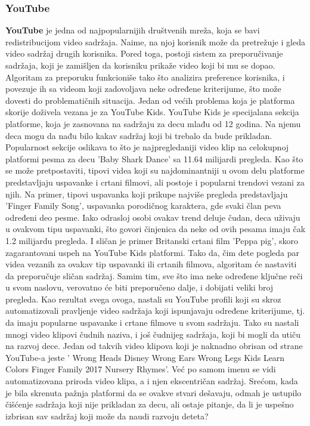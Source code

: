 \documentclass[a4paper]{article}
\begin{document}
\subsubsection{YouTube}
\textbf{YouTube} je jedna od najpopularnijih društvenih mreža, koja se bavi redistribucijom video sadržaja. Naime, na njoj korisnik može da pretrežuje i gleda video sadržaj drugih korisnika. Pored toga, postoji sistem za preporučivanje sadržaja, koji je zamišljen da korisniku prikaže video koji bi mu se dopao. Algoritam za preporuku funkcioniše tako što analizira preference korisnika, i povezuje ih sa videom koji zadovoljava neke određene kriterijume, što može dovesti do problematičnih situacija.
\newline
\newline
Jedan od većih problema koja je platforma skorije doživela vezana je za YouTube Kids. \cite{youtube} YouTube Kids je specijalana sekcija platforme, koja je zasnovana na sadržaju za decu mlađu od 12 godina. Na njemu deca mogu da nađu bilo kakav sadržaj koji bi trebalo da bude prikladan. Popularnost sekcije oslikava to što je najpregledaniji video klip na celokupnoj platformi pesma za decu 'Baby Shark Dance' sa 11.64 milijardi pregleda. Kao što se može pretpostaviti, tipovi videa koji su najdominantniji u ovom delu platforme predstavljaju uspavanke i crtani filmovi, ali postoje i popularni trendovi vezani za njih. 
\newline
Na primer, tipovi uspavanka koji prikupe najviše pregleda predstavljaju 'Finger Family Song', uspavanka porodičnog karaktera, gde svaki član peva određeni deo pesme. Iako odrasloj osobi ovakav trend deluje čudan, deca uživaju u ovakvom tipu uspavanki, što govori činjenica da neke od ovih pesama imaju čak 1.2 milijardu pregleda. I sličan je primer Britanski crtani film 'Peppa pig', skoro zagarantovani uspeh na YouTube Kids platformi. Tako da, čim dete pogleda par videa
vezanih za ovakav tip uspavanki ili crtanih filmova, algoritam će nastaviti da preporučuje sličan sadržaj. Samim tim, sve što ima neke određene ključne reči u svom naslovu, verovatno će biti preporučeno dalje, i dobijati veliki broj pregleda. Kao rezultat svega ovoga, nastali su YouTube profili koji su skroz automatizovali pravljenje video sadržaja koji ispunjavaju određene kriterijume, tj. da imaju popularne uspavanke i crtane filmove u svom sadržaju. Tako su nastali mnogi video klipovi čudnih naziva, i još čudnijeg sadržaja, koji bi mogli da utiču na razvoj dece. Jedan od takvih video klipova koji je naknadno obrisan od strane YouTube-a jeste ' Wrong Heads Disney Wrong Ears Wrong Legs Kids Learn Colors Finger Family 2017 Nursery Rhymes'. Već po samom imenu se vidi automatizovana priroda video klipa, a i njen ekscentričan sadržaj.
Srećom, kada je bila skrenuta pažnja platformi da se ovakve stvari dešavaju, odmah je ustupilo čišćenje sadržaja koji nije prikladan za decu, ali ostaje pitanje, da li je uspešno izbrisan sav sadržaj koji može da naudi razvoju deteta? 
\end{document}
